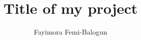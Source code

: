 \documentclass[a4paper,12pt,twoside]{report}
\begin{document}
\title{\LARGE {\bf Title of my project}\\
 \vspace*{6mm}
}

\author{Fayimora Femi-Balogun}
\normallinespacing
\maketitle

\preface

%
%
%

\body





%



%
%
\end{document}
